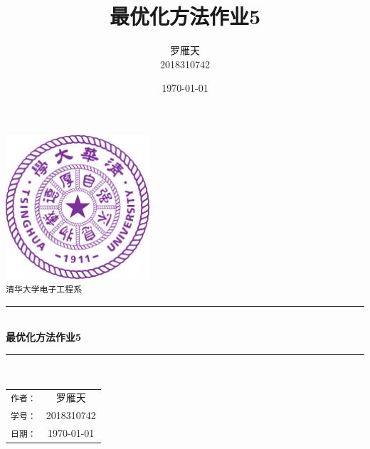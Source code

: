 \documentclass[a4paper]{article}
\title{最优化方法作业5}
\author{罗雁天 \\
2018310742}
\date{\today}
\begin{document}
\newcommand{\HRule}{\rule{\linewidth}{0.5mm}}
\begin{titlepage}
	\begin{center}
		\includegraphics[width=0.4\textwidth]{Tsinghua2.png}\\[1cm]
		\textsc{\Large \texttt{清华大学电子工程系}}\\[1cm]
		\HRule \\[1cm]
		{\Huge \bfseries 最优化方法作业5}\\[0.4cm]
		\HRule \\[3.5cm]
		\begin{minipage}{0.4\textwidth}
			\begin{center}
				\Large
				\begin{tabular}{cc}
					\texttt{作者：} & 罗雁天 \\[0.5cm]
					\texttt{学号：} & 2018310742 \\[0.5cm]
					\texttt{日期：} & \today
				\end{tabular}
			\end{center}
		\end{minipage}
		\vfill
	\end{center}
\end{titlepage}
\end{document}
